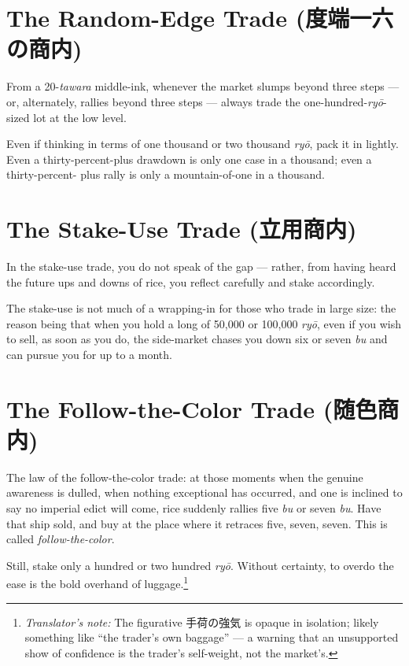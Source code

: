 \documentclass[10pt, openany]{book}
\newcommand{\jp}[1]{{\japanesefont #1}}
\newcommand{\tn}[1]{\footnote{\textit{Translator's note:} #1}}
\begin{document}
\section{The Random-Edge Trade (\jp{度端一六の商内})}

From a 20-\textit{tawara} middle-ink, whenever the market slumps
beyond three steps --- or, alternately, rallies beyond three
steps --- always trade the one-hundred-\textit{ry\=o}-sized lot at
the low level.

Even if thinking in terms of one thousand or two thousand
\textit{ry\=o}, pack it in lightly. Even a thirty-percent-plus
drawdown is only one case in a thousand; even a thirty-percent-
plus rally is only a mountain-of-one in a thousand.

\section{The Stake-Use Trade (\jp{立用商内})}

In the stake-use trade, you do not speak of the gap --- rather,
from having heard the future ups and downs of rice, you reflect
carefully and stake accordingly.

The stake-use is not much of a wrapping-in for those who trade in
large size: the reason being that when you hold a long of 50{,}000
or 100{,}000 \textit{ry\=o}, even if you wish to sell, as soon as
you do, the side-market chases you down six or seven \textit{bu}
and can pursue you for up to a month.

\section{The Follow-the-Color Trade (\jp{随色商内})}

The law of the follow-the-color trade: at those moments when the
genuine awareness is dulled, when nothing exceptional has
occurred, and one is inclined to say no imperial edict will come,
rice suddenly rallies five \textit{bu} or seven \textit{bu}. Have
that ship sold, and buy at the place where it retraces five,
seven, seven. This is called \textit{follow-the-color}.

Still, stake only a hundred or two hundred \textit{ry\=o}. Without
certainty, to overdo the ease is the bold overhand of luggage.\tn{The
figurative \jp{手荷の強気} is opaque in isolation; likely something
like ``the trader's own baggage'' --- a warning that an unsupported
show of confidence is the trader's self-weight, not the market's.}
\end{document}
